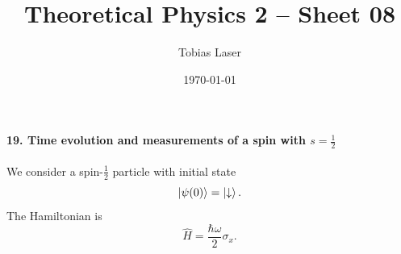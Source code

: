 \documentclass[11pt,a4paper]{scrartcl}
\newcommand{\op}[1]{\hat{#1}}
\begin{document}
    \title{Theoretical Physics 2 -- Sheet 08}
    \author{Tobias Laser}
    \date{\today}
    \maketitle
    \vfill
    \thispagestyle{empty}
    \newpage


    \paragraph{19. Time evolution and measurements of a spin with $s=\frac12$}

    We consider a spin-$\frac12$ particle with initial state
    \[
        \ket{\psi(0)} = \ket{\downarrow}.
    \]
    The Hamiltonian is
    \[
        \op{H} = \frac{\hbar\omega}{2}\sigma_x.
    \]
\end{document}
